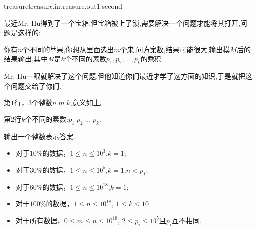 \documentclass[11pt,a4paper,oneside]{article}
\begin{document}
\begin{problem}{treasure}{treasure.in}{treasure.out}{1 second} 

	最近Mr. Hu得到了一个宝箱,但宝箱被上了锁,需要解决一个问题才能将其打开,问题是这样的:
	
	你有$n$个不同的苹果,你想从里面选出$m$个来,问方案数,结果可能很大,输出模$M$后的结果输出,其中$M$是$k$个不同的素数$p_1,p_2,...,p_k$的乘积.
	
	Mr. Hu一眼就解决了这个问题,但他知道你们最近才学了这方面的知识,于是就把这个问题交给了你们.
	

    \InputFile

    第$1$行，$3$个整数$n \; m \; k$,意义如上。
    
    第$2$行$k$个不同的素数:$p_1 \; p_2 \; ... \; p_k$.
   
    \OutputFile

	   输出一个整数表示答案.

    \Example

    \begin{example}
    \end{example}

    \Note
    
    \begin{itemize}
		\item 对于$10\%$的数据，$1 \leq n \leq 10^3$,$ k = 1 $;
        \item 对于$30\%$的数据，$1 \leq n \leq 10^5$,$ k = 1 $,$n < p_1$;
        \item 对于$60\%$的数据，$1 \leq n \leq 10^{18}$,$ k = 1 $; 
        \item 对于$100\%$的数据，$1 \leq n \leq 10^{18} $, $1 \leq k \leq 10 $
        \item 对于所有数据，$0 \leq m \leq n \leq 10^{18}$, $2 \leq p_i \leq 10^5$且$p_i$互不相同.
    \end{itemize}

\end{problem}
\end{document}
